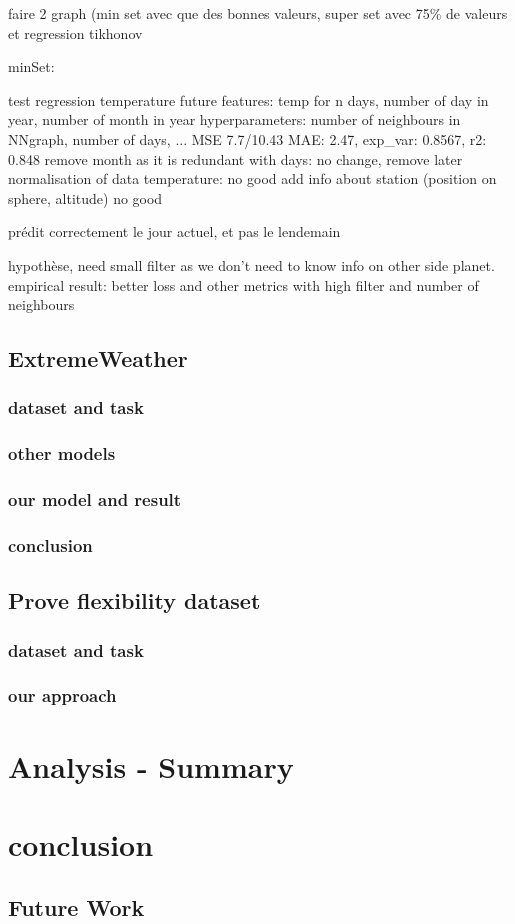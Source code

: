 \documentclass[11pt]{report}
\begin{document}
faire 2 graph (min set avec que des bonnes valeurs, super set avec 75\% de valeurs et regression tikhonov

minSet:

test regression temperature future
features: temp for n days, number of day in year, number of month in year
hyperparameters: number of neighbours in NNgraph, number of days, ...
MSE 7.7/10.43 MAE: 2.47, exp\_var: 0.8567, r2: 0.848
remove month as it is redundant with days:
no change, remove later
normalisation of data temperature:
no good
add info about station (position on sphere, altitude)
no good

prédit correctement le jour actuel, et pas le lendemain

hypothèse, need small filter as we don't need to know info on other side planet.
empirical result: better loss and other metrics with high filter and number of neighbours

\section{ExtremeWeather}
\subsection{dataset and task}
\subsection{other models}
\subsection{our model and result}
\subsection{conclusion}

\section{Prove flexibility dataset}
\subsection{dataset and task}
\subsection{our approach}


\chapter{Analysis - Summary}
\chapter{conclusion}
\section{Future Work}
\printbibliography
{}
\end{document}
